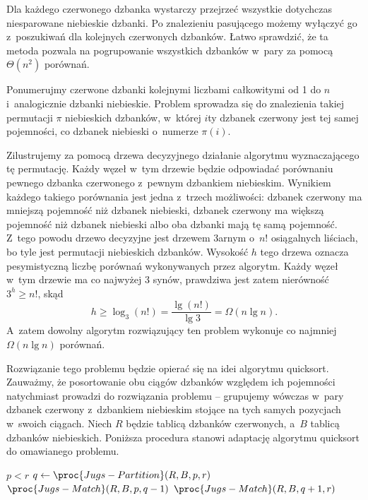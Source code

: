
\subproblem %
Dla każdego czerwonego dzbanka wystarczy przejrzeć wszystkie dotychczas niesparowane niebieskie dzbanki.
Po znalezieniu pasującego możemy wyłączyć go z~poszukiwań dla kolejnych czerwonych dzbanków.
Łatwo sprawdzić, że ta metoda pozwala na pogrupowanie wszystkich dzbanków w~pary za pomocą $\Theta(n^2)$ porównań.

\subproblem %
Ponumerujmy czerwone dzbanki kolejnymi liczbami całkowitymi od 1 do $n$ i~analogicznie dzbanki niebieskie.
Problem sprowadza się do znalezienia takiej permutacji $\pi$ niebieskich dzbanków, w~której $i$\nbhyphen ty dzbanek czerwony jest tej samej pojemności, co dzbanek niebieski o~numerze $\pi(i)$.

Zilustrujemy za pomocą drzewa decyzyjnego działanie algorytmu wyznaczającego tę permutację.
Każdy węzeł w~tym drzewie będzie odpowiadać porównaniu pewnego dzbanka czerwonego z~pewnym dzbankiem niebieskim.
Wynikiem każdego takiego porównania jest jedna z~trzech możliwości: dzbanek czerwony ma mniejszą pojemność niż dzbanek niebieski, dzbanek czerwony ma większą pojemność niż dzbanek niebieski albo oba dzbanki mają tę samą pojemność.
Z~tego powodu drzewo decyzyjne jest drzewem 3\nbhyphen arnym o~$n!$ osiągalnych liściach, bo tyle jest permutacji niebieskich dzbanków.
Wysokość $h$ tego drzewa oznacza pesymistyczną liczbę porównań wykonywanych przez algorytm.
Każdy węzeł w~tym drzewie ma co najwyżej 3 synów, prawdziwa jest zatem nierówność $3^h\ge n!$, skąd
\[
	h \ge \log_3(n!) = \frac{\lg(n!)}{\lg3} = \Omega(n\lg n).
\]
A~zatem dowolny algorytm rozwiązujący ten problem wykonuje co najmniej $\Omega(n\lg n)$ porównań.

\subproblem %
Rozwiązanie tego problemu będzie opierać się na idei algorytmu quicksort.
Zauważmy, że posortowanie obu ciągów dzbanków względem ich pojemności natychmiast prowadzi do rozwiązania problemu -- grupujemy wówczas w~pary dzbanek czerwony z~dzbankiem niebieskim stojące na tych samych pozycjach w~swoich ciągach.
Niech $R$ będzie tablicą dzbanków czerwonych, a~$B$ tablicą dzbanków niebieskich.
Poniższa procedura stanowi adaptację algorytmu quicksort do omawianego problemu.
\begin{codebox}
\li	\If $p<r$
\li		\Then $q\gets\proc{Jugs-Partition}(R,B,p,r)$
\li			$\proc{Jugs-Match}(R,B,p,q-1)$
\li			$\proc{Jugs-Match}(R,B,q+1,r)$
		\End
\end{codebox}

